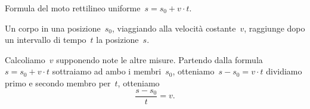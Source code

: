  \begin{esempio}
Formula del moto rettilineo uniforme~\(s=s_{0}+v\cdot t\).

Un corpo in una posizione~\(s_0\), viaggiando alla velocità costante~\(v\), 
raggiunge dopo un intervallo di tempo~\(t\) la posizione~\(s\).

Calcoliamo~\(v\) supponendo note le altre misure.
Partendo dalla formula~\(s=s_{0}+v\cdot t\) sottraiamo ad ambo i membri~\(s_0\), 
otteniamo~\(s-s_{0}=v\cdot t\)
dividiamo primo e secondo membro per~\(t\), otteniamo \[\frac{s-s_{0}}{t}=v.\]
 \end{esempio}


% 

